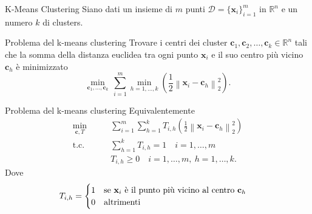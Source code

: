 \documentclass{beamer}
\begin{document}
\begin{frame}{K-Means Clustering}
	Siano dati un insieme di $m$ punti $\mathcal{D} = \{\textbf{x}_i\}^m_{i=1}$ in $\mathbb{R}^n$ e un numero $k$ di clusters.
	\begin{block}{Problema del k-means clustering}
		Trovare i centri dei cluster $ \textbf{c}_1, \textbf{c}_2, \dots, \textbf{c}_k  \in \mathbb{R}^n$ tali che la somma della distanza euclidea tra ogni punto $ \textbf{x}_i $
		e il suo centro più vicino $ \textbf{c}_h $ è minimizzato
		\[ \underset{\textbf{c}_1, \dots, \textbf{c}_k}{\min}\, \sum_{i=1}^{m} \underset{h = 1, \dots, k}{\min} \left( \frac{1}{2} \left\| \textbf{x}_i - \textbf{c}_h \right\|^2_2  \right).  \]
	\end{block}
\end{frame}
\begin{frame}
	\begin{block}{Problema del k-means clustering}
		Equivalentemente
		\[ \begin{split}
			\underset{\textbf{c}, T}{\text{min}}&\qquad \sum_{i=1}^{m}\sum_{h=1}^{k} T_{i,h} \left( \frac{1}{2} \left\| \textbf{x}_i - \textbf{c}_h \right\|^2_2  \right) \\
			\text{t.c.}& \qquad\sum_{h=1}^{k} T_{i,h} = 1 \quad i = 1, \dots, m\\
			& \qquad T_{i,h} \ge 0 \quad i = 1, \dots, m,\ h = 1, \dots,k.
		\end{split} \]
	\vspace{-0.5cm}
	Dove 
	\[  T_{i,h} =\begin{cases}
		1 \quad \text{se $ \textbf{x}_i $ è il punto più vicino al centro $ \textbf{c}_h $}\\
		0\quad \text{altrimenti}
	\end{cases} \]
\vspace{-0.4cm}
	\end{block}
\end{frame}
\end{document}
